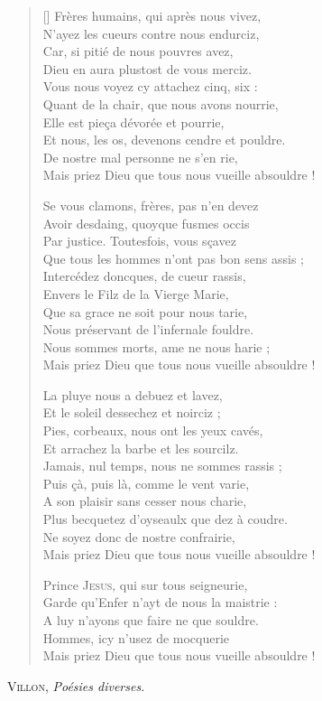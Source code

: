 \documentclass[12pt,a4paper,french]{scrartcl}
\begin{document}
\begin{verse}[\versewidth]
\vin Frères humains, qui après nous vivez,\\
N'ayez les cueurs contre nous endurciz,\\
Car, si pitié de nous pouvres avez,\\
Dieu en aura plustost de vous merciz.\\
Vous nous voyez cy attachez cinq, six :\\
Quant de la chair, que nous avons nourrie,\\
Elle est pieça dévorée et pourrie,\\
Et nous, les os, devenons cendre et pouldre.\\
De nostre mal personne ne s'en rie,\\
Mais priez Dieu que tous nous vueille absouldre !

\vin Se vous clamons, frères, pas n'en devez\\
Avoir desdaing, quoyque fusmes occis\\
Par justice. Toutesfois, vous sçavez\\
Que tous les hommes n'ont pas bon sens assis ;\\
Intercédez doncques, de cueur rassis,\\
Envers le Filz de la Vierge Marie,\\
Que sa grace ne soit pour nous tarie,\\
Nous préservant de l'infernale fouldre.\\
Nous sommes morts, ame ne nous harie ;\\
Mais priez Dieu que tous nous vueille absouldre !

\vin La pluye nous a debuez et lavez,\\
Et le soleil dessechez et noirciz ;\\
Pies, corbeaux, nous ont les yeux cavés,\\
Et arrachez la barbe et les sourcilz.\\
Jamais, nul temps, nous ne sommes rassis ;\\
Puis çà, puis là, comme le vent varie,\\
A son plaisir sans cesser nous charie,\\
Plus becquetez d'oyseaulx que dez à coudre.\\
Ne soyez donc de nostre confrairie,\\
Mais priez Dieu que tous nous vueille absouldre !

\hspace{0.5\versewidth}{\poemtitlefont\small%
ENVOI.
}%

\vin Prince \textsc{Jesus}, qui sur tous seigneurie,\\
Garde qu'Enfer n'ayt de nous la maistrie :\\
A luy n'ayons que faire ne que souldre.\\
Hommes, icy n'usez de mocquerie\\
Mais priez Dieu que tous nous vueille absouldre !
\end{verse}

\begin{flushright}
\large
\textsc{Villon}, \textit{Poésies diverses}.
\end{flushright}

\end{document}
